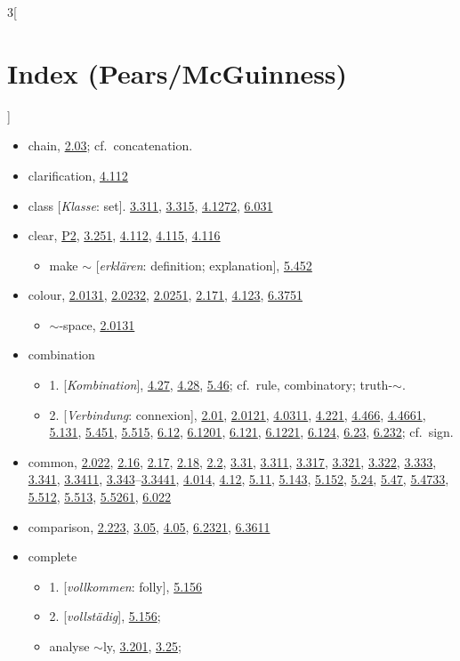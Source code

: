 \documentclass[oneside,openany,12pt]{book}
\newcommand{\indexentry}[1]{\item #1}
\newcommand{\indexsubentry}[1]{\begin{itemize} \item #1 \end{itemize}}
\newcommand{\indexref}[1]{\hyperlink{prop#1}{#1}}
\begin{document}
\begin{multicols}{3}[\section*{Index (Pears/McGuinness)}]
\begin{itemize}
\indexentry{chain, \indexref{2.03}; cf.\ concatenation.}

\indexentry{clarification, \indexref{4.112}}

\indexentry{class [\textit{Klasse}: set]. \indexref{3.311}, \indexref{3.315}, \indexref{4.1272}, \indexref{6.031}}

\indexentry{clear, \hyperlink{pref2}{P2}, \indexref{3.251}, \indexref{4.112}, \indexref{4.115}, \indexref{4.116}}

   \indexsubentry{make $\sim$ [\textit{erkl{\"a}ren}: definition; explanation], \indexref{5.452}}

\indexentry{colour, \indexref{2.0131}, \indexref{2.0232}, \indexref{2.0251}, \indexref{2.171}, \indexref{4.123}, \indexref{6.3751}}

   \indexsubentry{$\sim$-space, \indexref{2.0131}}

\indexentry{combination}

   \indexsubentry{1. [\textit{Kombination}], \indexref{4.27}, \indexref{4.28}, \indexref{5.46}; cf.\ rule, combinatory; truth-$\sim$.}

   \indexsubentry{2. [\textit{Verbindung}: connexion], \indexref{2.01}, \indexref{2.0121}, \indexref{4.0311}, \indexref{4.221}, \indexref{4.466}, \indexref{4.4661}, \indexref{5.131}, \indexref{5.451}, \indexref{5.515}, \indexref{6.12}, \indexref{6.1201}, \indexref{6.121}, \indexref{6.1221}, \indexref{6.124}, \indexref{6.23}, \indexref{6.232}; cf.\ sign.}

\indexentry{common, \indexref{2.022}, \indexref{2.16}, \indexref{2.17}, \indexref{2.18}, \indexref{2.2}, \indexref{3.31}, \indexref{3.311}, \indexref{3.317}, \indexref{3.321}, \indexref{3.322}, \indexref{3.333}, \indexref{3.341}, \indexref{3.3411}, \indexref{3.343}--\indexref{3.3441}, \indexref{4.014}, \indexref{4.12}, \indexref{5.11}, \indexref{5.143}, \indexref{5.152}, \indexref{5.24}, \indexref{5.47}, \indexref{5.4733}, \indexref{5.512}, \indexref{5.513}, \indexref{5.5261}, \indexref{6.022}}

\indexentry{comparison, \indexref{2.223}, \indexref{3.05}, \indexref{4.05}, \indexref{6.2321}, \indexref{6.3611}}

\indexentry{complete}

   \indexsubentry{1. [\textit{vollkommen}: folly], \indexref{5.156}}

   \indexsubentry{2. [\textit{vollst{\"a}dig}], \indexref{5.156};}

   \indexsubentry{analyse $\sim$ly, \indexref{3.201}, \indexref{3.25};}


\end{itemize}
\end{multicols}
\end{document}
